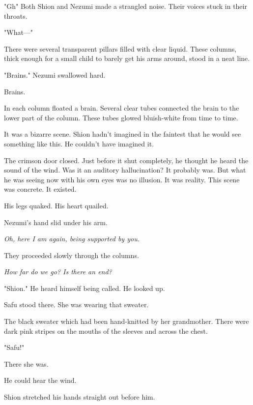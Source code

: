 "Gh\el " Both Shion and Nezumi made a strangled noise. Their voices stuck
in their throats.

"What---"

There were several transparent pillars filled with clear liquid. These
columns, thick enough for a small child to barely get his arms around,
stood in a neat line.

"Brains." Nezumi swallowed hard.

Brains.

In each column floated a brain. Several clear tubes connected the brain
to the lower part of the column. These tubes glowed bluish-white from
time to time.

It was a bizarre scene. Shion hadn't imagined in the faintest that he
would see something like this. He couldn't have imagined it.

The crimson door closed. Just before it shut completely, he thought he
heard the sound of the wind. Was it an auditory hallucination? It
probably was. But what he was seeing now with his own eyes was no
illusion. It was reality. This scene was concrete. It existed.

His legs quaked. His heart quailed.

Nezumi's hand slid under his arm.

\emph{Oh, here I am again, being supported by you.}

They proceeded slowly through the columns.

\emph{How far do we go? Is there an end?}

"Shion." He heard himself being called. He looked up.

Safu stood there. She was wearing that sweater.

The black sweater which had been hand-knitted by her grandmother. There
were dark pink stripes on the mouths of the sleeves and across the
chest.

"Safu!"

There she was.

He could hear the wind.

Shion stretched his hands straight out before him.